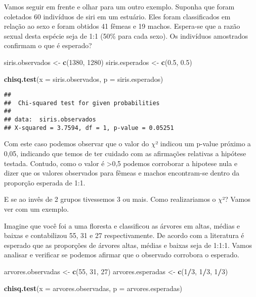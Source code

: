 \documentclass[titlepage, oneside, openany, a4paper]{book}
\newenvironment{Shaded}{\begin{snugshade}}{\end{snugshade}}
\newcommand{\DataTypeTok}[1]{\textcolor[rgb]{0.13,0.29,0.53}{#1}}
\newcommand{\DecValTok}[1]{\textcolor[rgb]{0.00,0.00,0.81}{#1}}
\newcommand{\FloatTok}[1]{\textcolor[rgb]{0.00,0.00,0.81}{#1}}
\newcommand{\KeywordTok}[1]{\textcolor[rgb]{0.13,0.29,0.53}{\textbf{#1}}}
\newcommand{\NormalTok}[1]{#1}
\newcommand{\OperatorTok}[1]{\textcolor[rgb]{0.81,0.36,0.00}{\textbf{#1}}}
\newcommand{\StringTok}[1]{\textcolor[rgb]{0.31,0.60,0.02}{#1}}
\begin{document}
Vamos seguir em frente e olhar para um outro exemplo. Suponha que foram coletados 60 indivíduos de siri em um estuário. Eles foram classificados em relação ao sexo e foram obtidos 41 fêmeas e 19 machos. Espera-se que a razão sexual desta espécie seja de 1:1 (50\% para cada sexo). Os indivíduos amostrados confirmam o que é esperado?

\begin{Shaded}
\begin{Highlighting}[]
\NormalTok{siris.observados <-}\StringTok{ }\KeywordTok{c}\NormalTok{(}\DecValTok{1380}\NormalTok{, }\DecValTok{1280}\NormalTok{)}
\NormalTok{siris.esperados <-}\StringTok{ }\KeywordTok{c}\NormalTok{(}\FloatTok{0.5}\NormalTok{, }\FloatTok{0.5}\NormalTok{)}

\KeywordTok{chisq.test}\NormalTok{(}\DataTypeTok{x =}\NormalTok{ siris.observados, }\DataTypeTok{p =}\NormalTok{ siris.esperados)}
\end{Highlighting}
\end{Shaded}

\begin{verbatim}
## 
##  Chi-squared test for given probabilities
## 
## data:  siris.observados
## X-squared = 3.7594, df = 1, p-value = 0.05251
\end{verbatim}

Com este caso podemos observar que o valor do \(\chi\)² indicou um p-value próximo a 0,05, indicando que temos de ter cuidado com as afirmações relativas a hipótese testada. Contudo, como o valor é \textgreater{}0,5 podemos corroborar a hipotese nula e dizer que os valores observados para fêmeas e machos encontram-se dentro da proporção esperada de 1:1.

E se ao invês de 2 grupos tivessemos 3 ou mais. Como realizariamos o \(\chi\)²? Vamos ver com um exemplo.

Imagine que você foi a uma floresta e classificou as árvores em altas, médias e baixas e contabilizou 55, 31 e 27 respectivamente. De acordo com a literatura é esperado que as proporções de árvores altas, médias e baixas seja de 1:1:1. Vamos analisar e verificar se podemos afirmar que o observado corrobora o esperado.

\begin{Shaded}
\begin{Highlighting}[]
\NormalTok{arvores.observadas <-}\StringTok{ }\KeywordTok{c}\NormalTok{(}\DecValTok{55}\NormalTok{, }\DecValTok{31}\NormalTok{, }\DecValTok{27}\NormalTok{)}
\NormalTok{arvores.esperadas <-}\StringTok{ }\KeywordTok{c}\NormalTok{(}\DecValTok{1}\OperatorTok{/}\DecValTok{3}\NormalTok{, }\DecValTok{1}\OperatorTok{/}\DecValTok{3}\NormalTok{, }\DecValTok{1}\OperatorTok{/}\DecValTok{3}\NormalTok{)}

\KeywordTok{chisq.test}\NormalTok{(}\DataTypeTok{x =}\NormalTok{ arvores.observadas, }\DataTypeTok{p =}\NormalTok{ arvores.esperadas)}
\end{Highlighting}
\end{Shaded}
\end{document}
